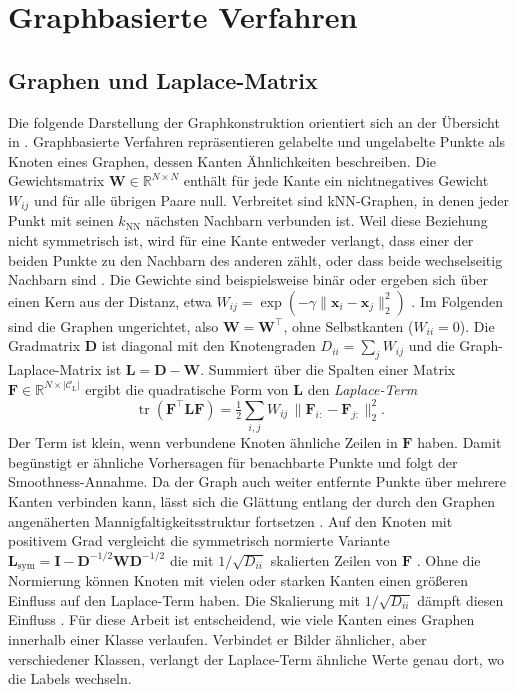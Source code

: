 \section{Graphbasierte Verfahren}
\label{sec:graph}

\subsection{Graphen und Laplace-Matrix}

Die folgende Darstellung der Graphkonstruktion orientiert sich an der Übersicht in \textcite{van_engelen_survey_2019}. Graphbasierte Verfahren repräsentieren gelabelte und ungelabelte Punkte als Knoten eines Graphen, dessen Kanten Ähnlichkeiten beschreiben. Die Gewichtsmatrix $\bm{W}\in\mathbb{R}^{N\times N}$ enthält für jede Kante ein nichtnegatives Gewicht $W_{ij}$ und für alle übrigen Paare null. Verbreitet sind \ac{kNN}-Graphen, in denen jeder Punkt mit seinen $k_{\mathrm{NN}}$ nächsten Nachbarn verbunden ist. Weil diese Beziehung nicht symmetrisch ist, wird für eine Kante entweder verlangt, dass einer der beiden Punkte zu den Nachbarn des anderen zählt, oder dass beide wechselseitig Nachbarn sind \cite{van_engelen_survey_2019}. Die Gewichte sind beispielsweise binär \cite{hoi_semi-supervised_2010} oder ergeben sich über einen Kern aus der Distanz, etwa $W_{ij}=\exp(-\gamma\lVert\bm{x}_i-\bm{x}_j\rVert_2^2)$ \cite{van_engelen_survey_2019}. Im Folgenden sind die Graphen ungerichtet, also $\bm{W}=\bm{W}^{\top}$, ohne Selbstkanten ($W_{ii}=0$). Die Gradmatrix $\bm{D}$ ist diagonal mit den Knotengraden $D_{ii}=\sum_j W_{ij}$ und die Graph-Laplace-Matrix ist $\bm{L}=\bm{D}-\bm{W}$. Summiert über die Spalten einer Matrix $\bm{F}\in\mathbb{R}^{N\times|\mathcal{C}_{\mathrm{L}}|}$ ergibt die quadratische Form von $\bm{L}$ den \emph{Laplace-Term} \cite{hoi_semi-supervised_2010, belkin_manifold_2006}
\begin{equation}
  \operatorname{tr}(\bm{F}^{\top}\bm{L}\bm{F})=\tfrac{1}{2}\sum_{i,j}W_{ij}\,\lVert\bm{F}_{i:}-\bm{F}_{j:}\rVert_2^2 .
  \label{eq:laplace}
\end{equation}
Der Term ist klein, wenn verbundene Knoten ähnliche Zeilen in $\bm{F}$ haben. Damit begünstigt er ähnliche Vorhersagen für benachbarte Punkte und folgt der Smoothness-Annahme. Da der Graph auch weiter entfernte Punkte über mehrere Kanten verbinden kann, lässt sich die Glättung entlang der durch den Graphen angenäherten Mannigfaltigkeitsstruktur fortsetzen \cite{zhou_learning_2003, belkin_manifold_2006, van_engelen_survey_2019}. Auf den Knoten mit positivem Grad vergleicht die symmetrisch normierte Variante $\bm{L}_{\mathrm{sym}}=\bm{I}-\bm{D}^{-1/2}\bm{W}\bm{D}^{-1/2}$ die mit $1/\sqrt{D_{ii}}$ skalierten Zeilen von $\bm{F}$ \cite{zhou_learning_2003, belkin_manifold_2006}. Ohne die Normierung können Knoten mit vielen oder starken Kanten einen größeren Einfluss auf den Laplace-Term haben. Die Skalierung mit $1/\sqrt{D_{ii}}$ dämpft diesen Einfluss \cite{van_engelen_survey_2019}. Für diese Arbeit ist entscheidend, wie viele Kanten eines Graphen innerhalb einer Klasse verlaufen. Verbindet er Bilder ähnlicher, aber verschiedener Klassen, verlangt der Laplace-Term ähnliche Werte genau dort, wo die Labels wechseln.

